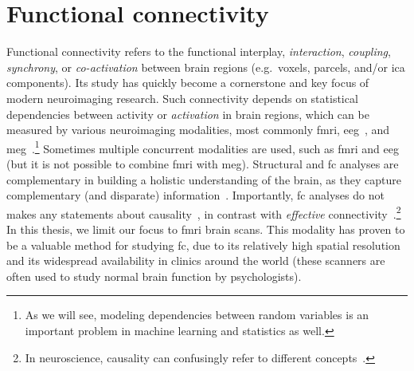 \clearpage
\section{Functional connectivity}

Functional connectivity refers to the functional interplay, \emph{interaction}, \emph{coupling}, \emph{synchrony}, or \emph{co-activation} between brain regions (e.g.~voxels, parcels, and/or \gls{ica} components).
Its study has quickly become a cornerstone and key focus of modern neuroimaging research.
Such connectivity depends on statistical dependencies between activity or \emph{activation} in brain regions, which can be measured by various neuroimaging modalities, most commonly \gls{fmri}, \gls{eeg}~\parencite[e.g.][]{Tagliazucchi2012, Chang2013}, and \gls{meg}~\parencite[e.g.][]{Baker2014, Vidaurre2018}.\footnote{As we will see, modeling dependencies between random variables is an important problem in machine learning and statistics as well.}
Sometimes multiple concurrent modalities are used, such as \gls{fmri} and \gls{eeg} (but it is not possible to combine \gls{fmri} with \gls{meg}).
%
Structural and \gls{fc} analyses are complementary in building a holistic understanding of the brain, as they capture complementary (and disparate) information~\parencite{Lang2012}.
Importantly, \gls{fc} analyses do not makes any statements about causality~\parencite{Mehler2018}, in contrast with \emph{effective} connectivity~\parencite{Friston2011, Smith2012b, Park2018, Zeidman2019, Zarghami2020}.\footnote{In neuroscience, causality can confusingly refer to different concepts~\parencite[see][]{Barack2022}.}
%
In this thesis, we limit our focus to \gls{fmri} brain scans.
This modality has proven to be a valuable method for studying \gls{fc}, due to its relatively high spatial resolution and its widespread availability in clinics around the world (these scanners are often used to study normal brain function by psychologists).

